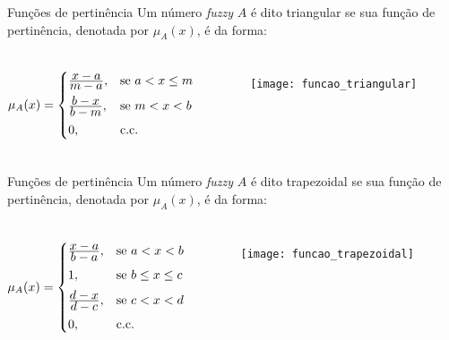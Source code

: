 \begin{frame}{Funções de pertinência}
Um número \emph{fuzzy} $A$ é dito triangular se sua função de pertinência, denotada por $\mu_{A}(x)$, é da forma:

\begin{columns}
\begin{equation*}
  \mu_A(x) =  \begin{cases}
                \frac{\displaystyle x - a}{\displaystyle m - a}, &\text{se}\ a < x \leq m\\[0.5em]
                \frac{\displaystyle b - x}{\displaystyle b - m}, &\text{se}\ m < x < b\\[0.5em]
                0, &\text{c.c.}
              \end{cases}
\end{equation*}

\begin{figure}[!h]
  \centering
  \texttt{[image: funcao\_triangular]}
\end{figure}
\end{columns}
\end{frame}

\begin{frame}{Funções de pertinência}
Um número \emph{fuzzy} $A$ é dito trapezoidal se sua função de pertinência, denotada por $\mu_{A}(x)$, é da forma:

\begin{columns}
\begin{equation*}
  \mu_A(x) =  \begin{cases}
                \frac{\displaystyle x - a}{\displaystyle b - a}, & \text{se}\ a < x < b\\[0.5em]
                1, & \text{se}\ b \leq x \leq c\\[0.5em]
                \frac{\displaystyle d - x}{\displaystyle d - c}, & \text{se}\ c < x < d\\[0.5em]
                0, & \text{c.c.}
              \end{cases}
\end{equation*}

\begin{figure}[!h]
  \centering
  \texttt{[image: funcao\_trapezoidal]}
\end{figure}
\end{columns}
\end{frame}


